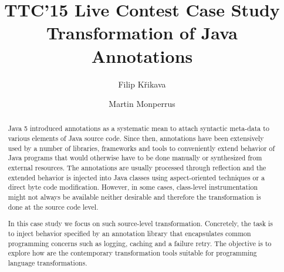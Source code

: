 \documentclass[submission]{eptcs}
\title{TTC'15 Live Contest Case Study \\ {\Large Transformation of Java Annotations}}
\author{
  Filip Křikava
  \institute{Czech Technical University, Czech Republic}
  \institute{INRIA Lille, France}
  \email{\href{mailto:filip.krikava@inria.fr}{filip.krikava@inria.fr}}
\and
  Martin Monperrus
  \institute{University of Lille 1, France}
  \institute{INRIA Lille, France}
  \email{\href{mailto:martin.monperrus@univ-lille1.fr}{martin.monperrus@univ-lille1.fr}}
}
\begin{document}
\maketitle

\begin{abstract}

Java 5 introduced annotations as a systematic mean to attach syntactic meta-data to various elements of Java source code.
Since then, annotations have been extensively used by a number of libraries, frameworks and tools to conveniently extend behavior of Java programs that would otherwise have to be done manually or synthesized from external resources.
The annotations are usually processed through reflection and the extended behavior is injected into Java classes using aspect-oriented techniques or a direct byte code modification.
However, in some cases, class-level instrumentation might not always be available neither desirable and therefore the transformation is done at the source code level.

In this case study we focus on such source-level transformation.
Concretely, the task is to inject behavior specified by an annotation library that encapsulates common programming concerns such as logging, caching and a failure retry.
The objective is to explore how are the contemporary transformation tools suitable for programming language transformations.
\end{abstract}






	

\newpage 
\appendix


\end{document}
